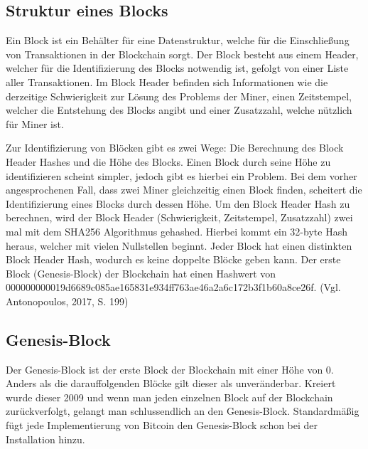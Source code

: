 \subsection{Struktur eines Blocks}
Ein Block ist ein Behälter für eine Datenstruktur, welche für die Einschließung von Transaktionen in der Blockchain sorgt. Der
Block besteht aus einem Header, welcher für die Identifizierung des Blocks notwendig ist, gefolgt von einer Liste aller 
Transaktionen. Im Block Header befinden sich Informationen wie die derzeitige Schwierigkeit zur Lösung des Problems der Miner,
einen Zeitstempel, welcher die Entstehung des Blocks angibt und einer Zusatzzahl, welche nützlich für Miner ist.

Zur Identifizierung von Blöcken gibt es zwei Wege: Die Berechnung des Block Header Hashes und die Höhe des Blocks. Einen Block 
durch seine Höhe zu identifizieren scheint simpler, jedoch gibt es hierbei ein Problem. Bei dem vorher angesprochenen Fall,
dass zwei Miner gleichzeitig einen Block finden, scheitert die Identifizierung eines Blocks durch dessen Höhe. Um den Block
Header Hash zu berechnen, wird der Block Header (Schwierigkeit, Zeitstempel, Zusatzzahl) zwei mal mit dem SHA256 Algorithmus 
gehashed. Hierbei kommt ein 32-byte Hash heraus, welcher mit vielen Nullstellen beginnt. Jeder Block hat einen distinkten Block
Header Hash, wodurch es keine doppelte Blöcke geben kann. Der erste Block (Genesis-Block) der Blockchain hat einen Hashwert von
000000000019d6689c085ae165831e934ff763ae46a2a6c172b3f1b60a8ce26f. (Vgl. Antonopoulos, 2017, S. 199)


\subsection{Genesis-Block}
Der Genesis-Block ist der erste Block der Blockchain mit einer Höhe von 0. Anders als die darauffolgenden Blöcke gilt dieser als
unveränderbar. Kreiert wurde dieser 2009 und wenn man jeden einzelnen Block auf der Blockchain zurückverfolgt, gelangt man
schlussendlich an den Genesis-Block. Standardmäßig fügt jede Implementierung von Bitcoin den Genesis-Block schon bei der 
Installation hinzu.